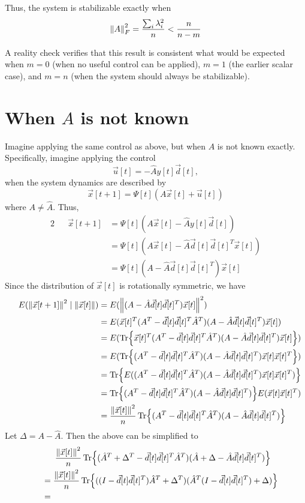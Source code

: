 \documentclass[letterpaper]{article}
\theoremstyle{remark}
\newcommand{\eqn}[1]{\begin{alignat*}{2}#1\end{alignat*}}
\begin{document}
Thus, the system is stabilizable exactly when
\[
    \norm{A}_F^2 = \frac{\sum_i \lambda_i^2}{n} < \frac{n}{n - m}
\]

A reality check verifies that this result is consistent what would be expected when $m = 0$ (when no useful control can be applied), $m = 1$ (the earlier scalar case), and $m = n$ (when the system should always be stabilizable).

\section*{When $A$ is not known}
Imagine applying the same control as above, but when $A$ is not known exactly. Specifically, imagine applying the control
\[
    \vec{u}[t] = -\hat{A} y[t] \vec{d}[t],
\]
when the system dynamics are described by
\[
    \vec{x}[t + 1] = \Psi[t](A\vec{x}[t] + \vec{u}[t])
\]
where $A \ne \hat{A}$. Thus,
\eqn{
    && \vec{x}[t + 1] &= \Psi[t](A\vec{x}[t] - \hat{A}y[t] \vec{d}[t]) \\
    &&&= \Psi[t](A\vec{x}[t] - \hat{A}\vec{d}[t] \vec{d}[t]^T \vec{x}[t]) \\
    &&&= \Psi[t](A - \hat{A}\vec{d}[t]\vec{d}[t]^T)\vec{x}[t]
}
Since the distribution of $\vec{x}[t]$ is rotationally symmetric, we have
\eqn{
    && E(\norm{\vec{x}[t + 1]}^2 \mid \norm{\vec{x}[t]}) &= E(\norm{(A - \hat{A}\vec{d}[t]\vec{d}[t]^T)\vec{x}[t]}^2) \\
    &&&= E(\vec{x}[t]^T(A^T - \vec{d}[t]\vec{d}[t]^T\hat{A}^T)(A - \hat{A}\vec{d}[t]\vec{d}[t]^T)\vec{x}[t]) \\
    &&&= E(\Tr{\vec{x}[t]^T(A^T - \vec{d}[t]\vec{d}[t]^T\hat{A}^T)(A - \hat{A}\vec{d}[t]\vec{d}[t]^T)\vec{x}[t]}) \\
    &&&= E(\Tr{(A^T - \vec{d}[t]\vec{d}[t]^T\hat{A}^T)(A - \hat{A}\vec{d}[t]\vec{d}[t]^T)\vec{x}[t]\vec{x}[t]^T}) \\
    &&&= \Tr{E((A^T - \vec{d}[t]\vec{d}[t]^T\hat{A}^T)(A - \hat{A}\vec{d}[t]\vec{d}[t]^T)\vec{x}[t]\vec{x}[t]^T)} \\
    &&&= \Tr{(A^T - \vec{d}[t]\vec{d}[t]^T\hat{A}^T)(A - \hat{A}\vec{d}[t]\vec{d}[t]^T)} E(\vec{x}[t]\vec{x}[t]^T) \\
    &&&= \frac{\norm{\vec{x}[t]}^2}{n} \Tr{(A^T - \vec{d}[t]\vec{d}[t]^T\hat{A}^T)(A - \hat{A}\vec{d}[t]\vec{d}[t]^T)}
}
Let $\Delta = A - \hat{A}$. Then the above can be simplified to
\eqn{
    &&&\phantom{==} \frac{\norm{\vec{x}[t]}^2}{n} \Tr{(\hat{A}^T + \Delta^T - \vec{d}[t]\vec{d}[t]^T\hat{A}^T)(\hat{A} + \Delta - \hat{A}\vec{d}[t]\vec{d}[t]^T)} \\
    &&&= \frac{\norm{\vec{x}[t]}^2}{n} \Tr{((I - \vec{d}[t]\vec{d}[t]^T)\hat{A}^T + \Delta^T)(\hat{A}^T(I - \vec{d}[t]\vec{d}[t]^T) + \Delta)} \\
    &&&= 
}
\end{document}
